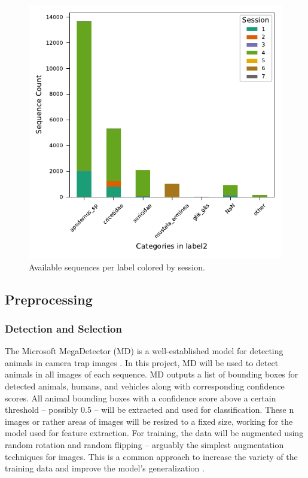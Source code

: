     \begin{figure}[ht]
    \centering
    \includegraphics{figures/label2_session.pdf}
    \caption{Available sequences per label colored by session.}
    \label{fig:sequenceperlabel}
    \end{figure}


    \subsection{Preprocessing}

        \subsubsection{Detection and Selection}

        The Microsoft MegaDetector (MD) is a well-established model for detecting animals in camera trap images \autocite{hernandezPytorchWildlifeCollaborativeDeep2024a, velezChoosingAppropriatePlatform2022, schneiderRecognitionEuropeanMammals2024}.
        In this project, MD will be used to detect animals in all images of each sequence. 
        MD outputs a list of bounding boxes for detected animals, humans, and vehicles along with corresponding confidence scores. 
        All animal bounding boxes with a confidence score above a certain threshold -- possibly 0.5 -- will be extracted and used for classification. 
        These n images or rather areas of images will be resized to a fixed size, working for the model used for feature extraction. 
        For training, the data will be augmented using random rotation and random flipping -- arguably the simplest augmentation techniques for images. 
        This is a common approach to increase the variety of the training data and improve the model's generalization \autocite{shortenSurveyImageData2019}.

